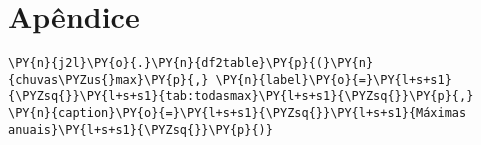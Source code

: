     \hypertarget{apuxeandice}{%
\section{Apêndice}\label{apuxeandice}}

    \begin{tcolorbox}[breakable, size=fbox, boxrule=1pt, pad at break*=1mm,colback=cellbackground, colframe=cellborder]
\begin{Verbatim}[commandchars=\\\{\}]
\PY{n}{j2l}\PY{o}{.}\PY{n}{df2table}\PY{p}{(}\PY{n}{chuvas\PYZus{}max}\PY{p}{,} \PY{n}{label}\PY{o}{=}\PY{l+s+s1}{\PYZsq{}}\PY{l+s+s1}{tab:todasmax}\PY{l+s+s1}{\PYZsq{}}\PY{p}{,} \PY{n}{caption}\PY{o}{=}\PY{l+s+s1}{\PYZsq{}}\PY{l+s+s1}{Máximas anuais}\PY{l+s+s1}{\PYZsq{}}\PY{p}{)}
\end{Verbatim}
\end{tcolorbox}

    
 
